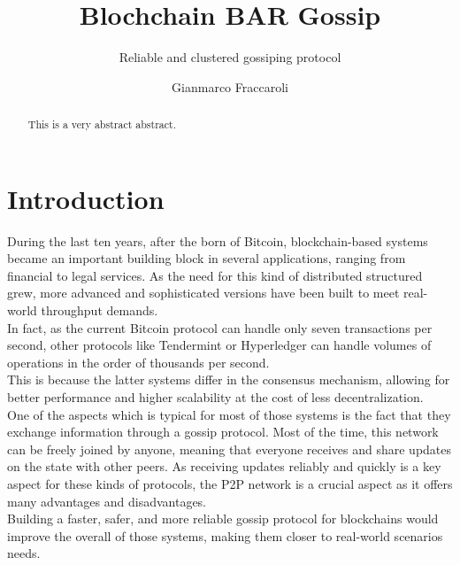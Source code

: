 \documentclass[mscthesis]{usiinfthesis}
\title{Blochchain BAR Gossip} %
\subtitle{Reliable and clustered gossiping protocol} %
\author{Gianmarco Fraccaroli} %
\begin{document}
\maketitle %

\frontmatter %

\begin{abstract}
This is a very abstract abstract. 

\lipsum
\end{abstract}



\begin{acknowledgements}
\lipsum 
\end{acknowledgements}

\tableofcontents 
\listoffigures %
\listoftables %

\mainmatter

\chapter{Introduction}
During the last ten years, after the born of Bitcoin, blockchain-based systems became an important building block in several applications, ranging from financial to legal services. As the need for this kind of distributed structured grew, more advanced and sophisticated versions have been built to meet real-world throughput demands. \\
In fact, as the current Bitcoin protocol can handle only seven transactions per second, other protocols like Tendermint or Hyperledger can handle volumes of operations in the order of thousands per second. \\
This is because the latter systems differ in the consensus mechanism, allowing for better performance and higher scalability at the cost of less decentralization. \\
One of the aspects which is typical for most of those systems is the fact that they exchange information through a gossip protocol. Most of the time, this network can be freely joined by anyone, meaning that everyone receives and share updates on the state with other peers. 
As receiving updates reliably and quickly is a key aspect for these kinds of protocols, the P2P network is a crucial aspect as it offers many advantages and disadvantages. \\
Building a faster, safer, and more reliable gossip protocol for blockchains would improve the overall of those systems, making them closer to real-world scenarios needs.
\end{document}
